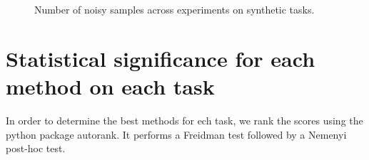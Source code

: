 \documentclass[runningheads]{llncs}
\begin{document}
\begin{figure}[htp]
  \centering
  \hfill
  \caption{Number of noisy samples across experiments on synthetic tasks.}
  \label{fig:synthetic_noisy}
  
\end{figure}


\newpage
\section{Statistical significance for each method on each task}

In order to determine the best methods for ech task, we rank the scores using the python package autorank. It performs a Freidman test followed by a Nemenyi post-hoc test.
\end{document}
